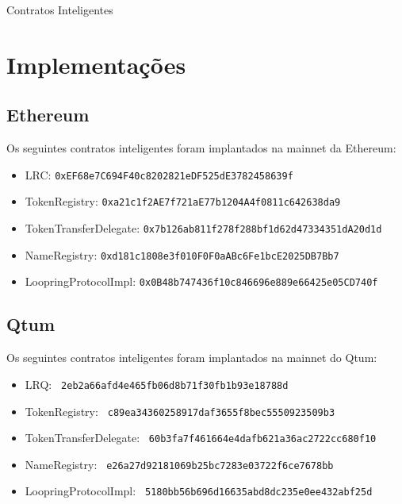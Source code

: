 \documentclass[UTF8,nofonts]{article}
\makeatletter
\newenvironment{figurehere}
 {\def\@captype{figure}}
 {}
\makeatother
\begin{document}
\begin{appendices}
\begin{center}
\begin{figurehere}
\caption{Contratos Inteligentes}
\label{fig:smartcontracts}
\end{figurehere}
\end{center}

\section{Implementações}


\subsection{Ethereum}
Os seguintes contratos inteligentes foram implantados na mainnet da Ethereum:
\begin{itemize}
\item LRC: \verb|0xEF68e7C694F40c8202821eDF525dE3782458639f|
\item TokenRegistry: \verb|0xa21c1f2AE7f721aE77b1204A4f0811c642638da9|
\item TokenTransferDelegate: \verb|0x7b126ab811f278f288bf1d62d47334351dA20d1d|
\item NameRegistry: \verb|0xd181c1808e3f010F0F0aABc6Fe1bcE2025DB7Bb7|
\item LoopringProtocolImpl: \verb|0x0B48b747436f10c846696e889e66425e05CD740f|
\end{itemize}

\subsection{Qtum}
Os seguintes contratos inteligentes foram implantados na  mainnet do Qtum:
\begin{itemize}
\item LRQ: \verb| 2eb2a66afd4e465fb06d8b71f30fb1b93e18788d |
\item TokenRegistry: \verb| c89ea34360258917daf3655f8bec5550923509b3 |
\item TokenTransferDelegate: \verb| 60b3fa7f461664e4dafb621a36ac2722cc680f10 |
\item NameRegistry: \verb| e26a27d92181069b25bc7283e03722f6ce7678bb |
\item LoopringProtocolImpl: \verb| 5180bb56b696d16635abd8dc235e0ee432abf25d |
\end{itemize}

\end{appendices}
\end{document}
